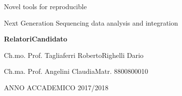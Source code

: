 \documentclass[a4paper, oneside, british, intoc, bibliograph=totoc, index=totoc, BCOR10mm, twoside, openright]{book}
\numberwithin{equation}{section}
\numberwithin{figure}{section}
\begin{document}
\vspace{1.5cm}

\begin{center}
Novel tools for reproducible 

Next Generation Sequencing data analysis and integration
\par\end{center}

\vspace{1.5cm}

\textbf{\large{}Relatori}\hfill{}\textbf{\large{}Candidato}{\large \par}

Ch.mo. Prof. Tagliaferri Roberto\hfill{}Righelli Dario

Ch.ma. Prof. Angelini Claudia\hfill{}Matr. 8800800010

\vspace{1.5cm}

\begin{center}
ANNO ACCADEMICO 2017/2018
\par\end{center}

\cleardoublepage
\end{document}
